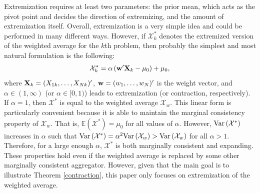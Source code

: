 \documentclass[11pt]{article}
\newcommand{\E}{\mathbb{E}}
\theoremstyle{definition}
\theoremstyle{definition}
\def\w{{\bf w}}
\def\X{{\bf X}}
\def\E{{\mathbb E}}
\def\Var{{\rm Var}\,}
\begin{document}
Extremization requires at least two parameters: the prior mean, which acts as the pivot point and decides the direction of extremizing, and the amount of extremization itself.  Overall, extremization is a very simple idea and could be performed in many different ways. However, if $\mathcal{X}_k^*$ denotes the extremized version of the weighted average for the $k$th problem, then probably the simplest and most natural formulation is the following:
\begin{align*}
\mathcal{X}_k^* = \alpha  \left(  \w'\X_{k} - \mu_0\right) + \mu_0,
\end{align*}
 where $\X_k = (X_{1k}, \dots, X_{Nk})'$, $\w = (w_1, \dots, w_N)'$ is the weight vector, and $\alpha \in (1, \infty)$ (or $\alpha \in [0, 1)$) leads to extremization (or contraction, respectively). If $\alpha = 1$, then $\mathcal{X}^*$ is equal to the weighted average $\mathcal{X}_w$.  This linear form is particularly convenient because it is able to maintain the marginal consistency property of $\mathcal{X}_w$. That is, $\E(\mathcal{X}^*) = \mu_0$ for all values of $\alpha$.  However, $\Var(\mathcal{X}^*)$ increases in $\alpha$ such that $\Var(\mathcal{X}^*) = \alpha^2 \Var(\mathcal{X}_w) > \Var(\mathcal{X}_w)$ for all $\alpha > 1$. Therefore, for a large enough $\alpha$, $\mathcal{X}^*$ is both marginally consistent and expanding. These properties hold even if the weighted average is replaced by some other marginally consistent aggregator. However, given that the main goal is to illustrate Theorem \ref{contraction}, this paper only focuses on extremization of the weighted average.
\end{document}
